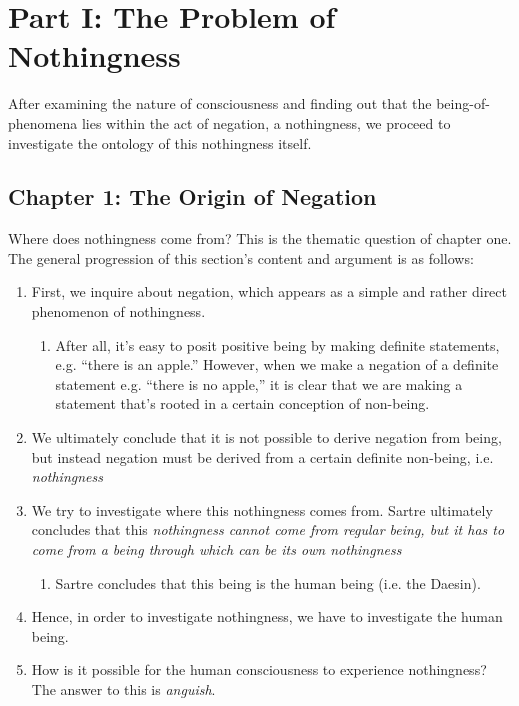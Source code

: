\chapter{Part I: The Problem of Nothingness}

\textsf{After examining the nature of consciousness and finding out that the being-of-phenomena lies within the act of negation, a nothingness, we proceed to investigate the ontology of this nothingness itself.}

\section{Chapter 1: The Origin of Negation}
Where does nothingness come from? This is the thematic question of chapter one. The general progression of this section's content and argument is as follows:

\begin{enumerate}
  \item First, we inquire about negation, which appears as a simple and rather direct phenomenon of nothingness.
  \begin{enumerate}
    \item After all, it's easy to posit positive being by making definite statements, e.g. \enquote{there is an apple.} However, when we make a negation of a definite statement e.g. \enquote{there is no apple,} it is clear that we are making a statement that's rooted in a certain conception of non-being.
  \end{enumerate}
  \item We ultimately conclude that it is not possible to derive negation from being, but instead negation must be derived from a certain definite non-being, i.e. \emph{nothingness}
  \item We try to investigate where this nothingness comes from. Sartre ultimately concludes that this \emph{nothingness cannot come from regular being, but it has to come from a being through which can be its own nothingness}
  \begin{enumerate}
    \item Sartre concludes that this being is the human being (i.e. the Daesin).
  \end{enumerate}
  \item Hence, in order to investigate nothingness, we have to investigate the human being.
  \item How is it possible for the human consciousness to experience nothingness? The answer to this is \emph{anguish}. 
\end{enumerate}

